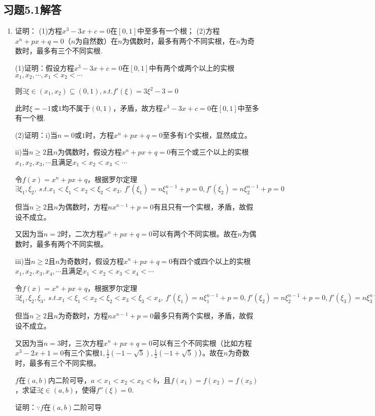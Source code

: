 \documentclass[12pt,UTF8]{ctexart}
\begin{document}
\subsection{习题5.1解答}
\begin{enumerate}
\item 证明：
\newline
(1)方程$x^3-3x+c=0$在$[0,1]$中至多有一个根；
\newline
(2)方程$x^n+px+q=0$（$n$为自然数）在$n$为偶数时，最多有两个不同实根，在$n$为奇数时，最多有三个不同实根.

(1)证明：假设方程$x^3-3x+c=0$在$[0,1]$中有两个或两个以上的实根$x_1,x_2,\cdots,x_1<x_2<\cdots$

则$\exists\xi\in(x_1,x_2)\subseteq(0,1),s.t.f'(\xi)=3\xi^2-3=0$

此时$\xi=-1$或$1$均不属于$(0,1)$，矛盾，故方程$x^3-3x+c=0$在$[0,1]$中至多有一个根.

(2)证明：i)当$n=0$或$1$时，方程$x^n+px+q=0$至多有$1$个实根，显然成立。

ii)当$n\geq2$且$n$为偶数时，假设方程$x^n+px+q=0$有三个或三个以上的实根$x_1,x_2,x_3,\cdots$且满足$x_1<x_2<x_3<\cdots$

令$f(x)=x^n+px+q$，根据罗尔定理$\exists\xi_1,\xi_2,\ s.t.x_1<\xi_1<x_2<\xi_2<x_3,\ f'(\xi_1)=n\xi_1^{n-1}+p=0,f'(\xi_2)=n\xi_2^{n-1}+p=0$

但当$n\geq2$且$n$为偶数时，方程$nx^{n-1}+p=0$有且只有一个实根，矛盾，故假设不成立。

又因为当$n=2$时，二次方程$x^n+px+q=0$可以有两个不同实根。故在$n$为偶数时，最多有两个不同实根。

iii)当$n\geq2$且$n$为奇数时，假设方程$x^n+px+q=0$有四个或四个以上的实根$x_1,x_2,x_3,x_4,\cdots$且满足$x_1<x_2<x_3<x_4<\cdots$

令$f(x)=x^n+px+q$，根据罗尔定理$\exists\xi_1,\xi_2,\xi_3,\ s.t.x_1<\xi_1<x_2<\xi_2<x_3<\xi_3<x_4,\ f'(\xi_1)=n\xi_1^{n-1}+p=0,f'(\xi_2)=n\xi_2^{n-1}+p=0,f'(\xi_3)=n\xi_3^{n-1}+p=0$

但当$n\geq2$且$n$为奇数时，方程$nx^{n-1}+p=0$最多只有两个实根，矛盾，故假设不成立。

又因为当$n=3$时，三次方程$x^n+px+q=0$可以有三个不同实根（比如方程$x^3-2x+1=0$有三个实根$1,\frac12(-1-\sqrt5),\frac12(-1+\sqrt5)$）。故在$n$为奇数时，最多有三个不同实根。

$f$在$(a,b)$内二阶可导，$a<x_1<x_2<x_3<b$，且$f(x_1)=f(x_2)=f(x_3)$，求证$\exists\xi\in(a,b)$，使得$f''(\xi)=0$.

证明：$\because f$在$(a,b)$二阶可导


\end{enumerate}
\end{document}
